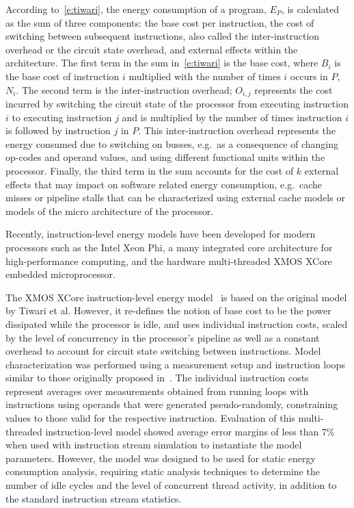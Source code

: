 According to~\ref{e:tiwari}, the energy consumption of a program, $E_P$, is calculated as the sum of three components: the base cost per instruction, the cost of switching between subsequent instructions, also called the inter-instruction overhead or the circuit state overhead, and external effects within the architecture.
%
The first term in the sum in~\ref{e:tiwari} is the base cost, where $B_i$ is the base cost of instruction $i$ multiplied with the number of times $i$ occurs in $P$, $N_i$.
%
The second term is the inter-instruction overhead; $O_{i,j}$ represents the cost incurred by switching the circuit state of the processor from executing instruction $i$ to executing instruction $j$ and is multiplied by the number of times instruction $i$ is followed by instruction $j$ in $P$. This inter-instruction overhead represents the energy consumed due to switching on busses, e.g.\ as a consequence of changing op-codes and operand values, and using different functional units within the processor. 
%
Finally, the third term in the sum accounts for the cost of $k$ external effects that may impact on software related energy consumption, e.g.\ cache misses or pipeline stalls that can be characterized using external cache models or models of the micro architecture of the processor. 

Recently, instruction-level energy models have been developed for modern processors such as the Intel Xeon Phi, a many integrated core architecture for high-performance computing, and the hardware multi-threaded XMOS XCore embedded microprocessor.

The XMOS XCore instruction-level energy
model~\cite{DBLP:journals/tecs/KerrisonE15} is based on the original model by
Tiwari et al. However, it re-defines the notion of base cost to be the power dissipated
while the processor is idle, and  uses individual instruction costs, scaled by
the level of concurrency in the processor's pipeline as well as a constant overhead to
account for circuit state switching between instructions.
%
Model characterization was performed using a measurement setup and instruction
loops similar to those originally proposed in~\cite{Tiwari-embedded-1994}. The
individual instruction costs represent averages over measurements obtained from
running loops with instructions using operands that were generated
pseudo-randomly, constraining values to those valid for the respective
instruction.
%
Evaluation of this multi-threaded instruction-level model showed average error
margins of less than 7\% when used with instruction stream simulation to
instantiate the model parameters.
%
However, the model was designed to be used for static energy consumption analysis,
requiring static analysis techniques to determine the number of idle cycles and
the level of concurrent thread activity, in addition to the standard
instruction stream statistics.

